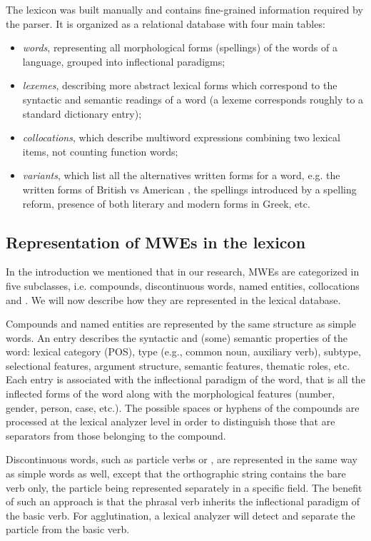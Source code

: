\documentclass[output=paper]{langsci/langscibook}
\begin{document}
The lexicon was built manually and contains fine-grained information required by the parser. It is organized as a relational database with four main tables:

\vspace*{3mm}
\begin{itemize}
\item \emph{words}, representing all morphological forms (spellings) of the words of a language, grouped into inflectional paradigms; 
\item \emph{lexemes}, describing more abstract lexical forms which correspond to the syntactic and semantic readings of a word (a lexeme corresponds roughly to a standard dictionary entry); 
\item \emph{collocations}, which describe multiword expressions combining two lexical items, not counting function words;
\item \emph{variants}, which list all the alternatives written forms for a word, e.g. the written forms of British  vs American , the spellings introduced by a spelling reform, presence of both literary and modern forms in Greek, etc.
\end{itemize}

\subsection{Representation of MWEs in the lexicon}

In the introduction we mentioned that in our research, MWEs are categorized in five subclasses, i.e. compounds, discontinuous words, named entities, collocations and .
We will now describe how they are represented in the lexical database.

Compounds and named entities are represented by the same structure as simple words. An entry describes the syntactic and (some) semantic properties of the word: lexical category (POS),
type (e.g., common noun, auxiliary verb), subtype, selectional features, argument structure, semantic features, thematic roles, etc. Each entry is associated with the inflectional paradigm of the word, 
that is all the inflected forms of the word along with the morphological features (number, gender, person, case, etc.). The possible spaces or hyphens of the compounds are processed 
at the lexical analyzer level in order to distinguish those that are separators from those belonging to the compound.

Discontinuous words, such as particle verbs or , are represented in the same way as simple words as well, except that the orthographic string contains the bare verb only, 
the particle being represented separately in a specific field. The benefit of such an approach is that the phrasal verb inherits the inflectional paradigm of the basic verb. For agglutination,
a lexical analyzer will detect and separate the particle from the basic verb.
\end{document}
